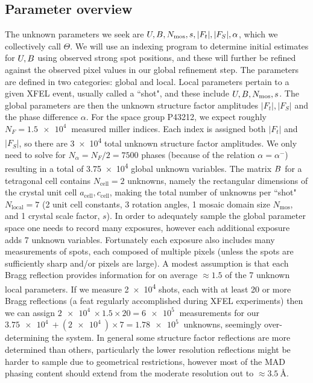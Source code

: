 \documentclass[dists.tex]{subfiles}
\begin{document}
\subsection{Parameter overview}
The unknown parameters we seek are  $U, B, N_\text{mos}, s, |F_t|, |F_S|, \alpha $, which we collectively call $\Theta $. We will use an indexing program to determine initial estimates for $U, B$ using observed strong spot positions, and these will further be refined against the observed pixel values in our global refinement step. The parameters are defined in two categories: global and local. Local parameters pertain to a given XFEL event, usually called a ``shot", and these include $U, B, N_\text{mos}, s$. The global parameters are then the unknown structure factor amplitudes $|F_t|, |F_S|$ and the phase difference $\alpha$. For the space group P43212, we expect roughly $N_F=\SI{1.5e4}{}$ measured miller indices. Each index is assigned both $|F_t|$ and $|F_S|$, so there are \SI{3e4}{} total unknown structure factor amplitudes. We only need to solve for $N_\alpha = N_F/2 = 7500$ phases (because of the relation $\alpha = \alpha^-$) resulting in a total of \SI{3.75e4}{} global unknown variables. The matrix $B$ for a tetragonal cell contains $N_\text{cell}=2$ unknowns, namely the rectangular dimensions of the crystal unit cell $a_\text{cell}, c_\text{cell}$, making the total number of unknowns per ``shot" $N_\text{local}=7$ (2 unit cell constants, 3 rotation angles, 1 mosaic domain size $N_\text{mos}$, and 1 crystal scale factor, $s$). In order to adequately sample the global parameter space one needs to record many exposures, however each additional exposure adds 7 unknown variables. Fortunately each exposure also includes many measurements of spots, each composed of multiple pixels (unless the spots are sufficiently sharp and/or pixels are large). A modest assumption is that each Bragg reflection provides information for on average $\approx 1.5$ of the 7 unknown local parameters. If we measure \SI{2e4}{} shots, each with at least 20 or more Bragg reflections (a feat regularly accomplished during XFEL experiments) then we can assign $\SI{2e4}{} \times 1.5 \times 20 = \SI{6e5}{}$ measurements for our $\SI{3.75e4}{} + (\SI{2e4}{} )\times 7 = \SI{1.78e5}{}$ unknowns, seemingly over-determining the system. In general some structure factor reflections are more determined than others,  particularly the lower resolution reflections might be harder to sample due to geometrical restrictions, however most of the MAD phasing content should extend from the moderate resolution out to $\approx\SI{3.5}{\angstrom}$. 
\end{document}

